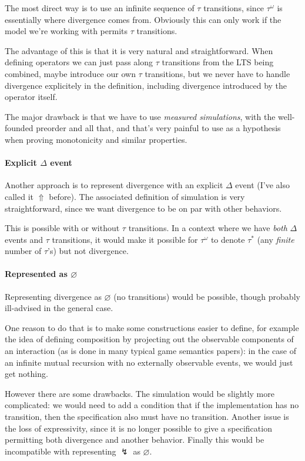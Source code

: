 \documentclass[11pt]{article}
\begin{document}
The most direct way is to use an infinite sequence of $\tau$ transitions,
since $\tau^\omega$ is essentially where divergence comes from.
Obviously this can only work if the model we're working with
permits $\tau$ transitions.

The advantage of this is that it is very natural and straightforward.
When defining operators we can just pass along $\tau$ transitions from
the LTS being combined,
maybe introduce our own $\tau$ transitions,
but we never have to handle divergence explicitely
in the definition,
including divergence introduced by the operator itself.

The major drawback is that we have to use \emph{measured simulations},
with the well-founded preorder and all that,
and that's very painful to use as a hypothesis
when proving monotonicity and similar properties.

\paragraph{Explicit $\Delta$ event}

Another approach is to represent divergence
with an explicit $\Delta$ event (I've also called it $\Uparrow$ before).
The associated definition of simulation is very straightforward,
since we want divergence to be on par with other behaviors.

This is possible with or without $\tau$ transitions.
In a context where we have \emph{both} $\Delta$ events and $\tau$ transitions,
it would make it possible for $\tau^\omega$ to denote $\tau^*$
(any \emph{finite} number of $\tau$'s)
but not divergence.

\paragraph{Represented as $\varnothing$}

Representing divergence as $\varnothing$ (no transitions)
would be possible, though probably ill-advised in the general case.

One reason to do that is
to make some constructions easier to define,
for example the idea of defining composition
by projecting out the observable components of an interaction
(as is done in many typical game semantics papers):
in the case of an infinite mutual recursion with no
externally observable events,
we would just get nothing.

However there are some drawbacks.
The simulation would be slightly more complicated:
we would need to add a condition that
if the implementation has no transition,
then the specification also must have no transition.
Another issue is the loss of expressivity,
since it is no longer possible to give a specification
permitting both divergence and another behavior.
Finally this would be incompatible with
representing $\lightning$ as $\varnothing$.
\end{document}
